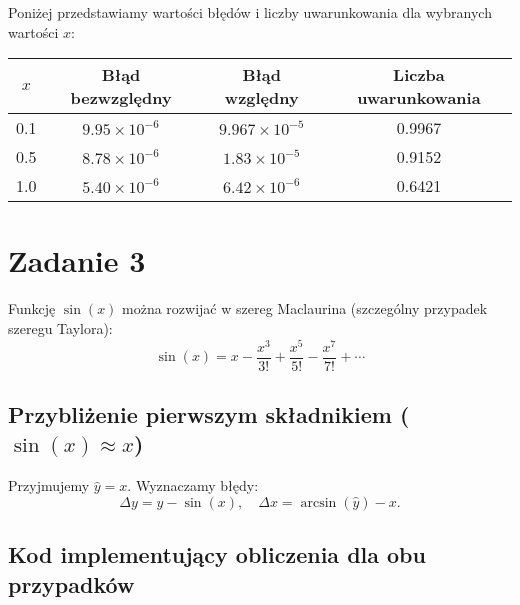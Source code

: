 \documentclass{article}
\begin{document}
Poniżej przedstawiamy wartości błędów i liczby uwarunkowania dla wybranych wartości $x$:

\begin{center}
\begin{tabular}{|c|c|c|c|}
    \hline
    $x$ & Błąd bezwzględny & Błąd względny & Liczba uwarunkowania \\
    \hline
    0.1 & $9.95 \times 10^{-6}$ & $9.967 \times 10^{-5}$ & 0.9967 \\
    0.5 & $8.78 \times 10^{-6}$ & $1.83 \times 10^{-5}$ & 0.9152 \\
    1.0 & $5.40 \times 10^{-6}$ & $6.42 \times 10^{-6}$ & 0.6421 \\
    \hline
\end{tabular}
\end{center}

\section{Zadanie 3}

Funkcję $\sin(x)$ można rozwijać w szereg Maclaurina (szczególny przypadek szeregu Taylora):
\begin{equation}
    \sin(x) = x - \frac{x^3}{3!} + \frac{x^5}{5!} - \frac{x^7}{7!} + \cdots
\end{equation}

\subsection{Przybliżenie pierwszym składnikiem ($\sin(x) \approx x$)}

Przyjmujemy $\hat{y} = x$. Wyznaczamy błędy:
\begin{equation}
    \Delta y = \hat{y} - \sin(x), \quad \Delta x = \arcsin(\hat{y}) - x.
\end{equation}

\subsection{Kod implementujący obliczenia dla obu przypadków}
\end{document}
